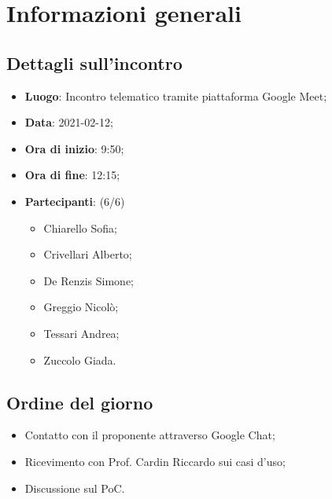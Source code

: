 \section{Informazioni generali}

\subsection{Dettagli sull'incontro}
\begin{itemize}
\item \textbf{Luogo}: Incontro telematico tramite piattaforma Google Meet;
\item \textbf{Data}: 2021-02-12;
\item \textbf{Ora di inizio}: 9:50;
\item \textbf{Ora di fine}: 12:15;
\item \textbf{Partecipanti}: (6/6)
\begin{itemize}
	\item Chiarello Sofia;
    \item Crivellari Alberto;
    \item De Renzis Simone;
    \item Greggio Nicolò;
    \item Tessari Andrea;
    \item Zuccolo Giada.
\end{itemize}
\end{itemize}

\subsection{Ordine del giorno}
\begin{itemize}
	\item Contatto con il proponente attraverso Google Chat;
	\item Ricevimento con Prof. Cardin Riccardo sui casi d'uso;
	\item Discussione sul PoC.
\end{itemize}


